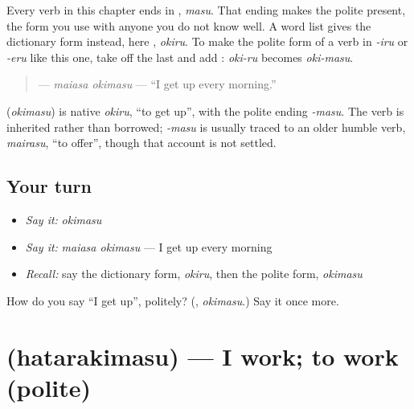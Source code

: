 Every verb in this chapter ends in \textbf{}, \emph{masu}. That ending makes the polite present, the form you use with anyone you do not know well. A word list gives the dictionary form instead, here \textbf{}, \emph{okiru}. To make the polite form of a verb in \emph{-iru} or \emph{-eru} like this one, take off the last \textbf{} and add \textbf{}: \emph{oki-ru} becomes \emph{oki-masu}.

\begin{quote}
\textbf{ } — \emph{maiasa okimasu} — \textquotedblleft{}I get up every morning.\textquotedblright{}
\end{quote}

\begin{cousinweb}
\textbf{} (\emph{okimasu}) is native \emph{okiru}, \textquotedblleft{}to get up\textquotedblright{}, with the polite ending \emph{-masu}. The verb is inherited rather than borrowed; \emph{-masu} is usually traced to an older humble verb, \emph{mairasu}, \textquotedblleft{}to offer\textquotedblright{}, though that account is not settled.
\end{cousinweb}

\subsection*{Your turn}
\begin{itemize}
\raggedright
  \item \emph{Say it:} \emph{okimasu}
  \item \emph{Say it:} \emph{maiasa okimasu} — I get up every morning
  \item \emph{Recall:} say the dictionary form, \emph{okiru}, then the polite form, \emph{okimasu}
\end{itemize}

\begin{tcolorbox}[breakable,colback=teal!4,colframe=teal!35!black,title={Before you move on}]
How do you say \textquotedblleft{}I get up\textquotedblright{}, politely? (\textbf{}, \emph{okimasu}.) Say it once more.
\end{tcolorbox}
\section[\texorpdfstring{\ja{はたらきます} (hatarakimasu)}{はたらきます (hatarakimasu)}]{ (hatarakimasu) — I work; to work (polite)}

\label{lesson:JA-C138-hatarakimasu}



